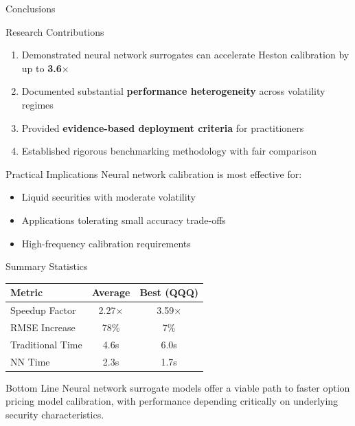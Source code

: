\documentclass{beamer}
\begin{document}
\begin{frame}{Conclusions}
    \begin{block}{Research Contributions}
        \begin{enumerate}
            \item Demonstrated neural network surrogates can accelerate Heston calibration by up to \textbf{3.6$\times$}
            \item Documented substantial \textbf{performance heterogeneity} across volatility regimes
            \item Provided \textbf{evidence-based deployment criteria} for practitioners
            \item Established rigorous benchmarking methodology with fair comparison
        \end{enumerate}
    \end{block}

    \vspace{0.3cm}

    \begin{alertblock}{Practical Implications}
        Neural network calibration is most effective for:
        \begin{itemize}
            \item Liquid securities with moderate volatility
            \item Applications tolerating small accuracy trade-offs
            \item High-frequency calibration requirements
        \end{itemize}
    \end{alertblock}
\end{frame}

\begin{frame}{Summary Statistics}
    \centering
    \begin{tabular}{lcc}
        \toprule
        \textbf{Metric} & \textbf{Average} & \textbf{Best (QQQ)} \\
        \midrule
        Speedup Factor & 2.27$\times$ & 3.59$\times$ \\
        RMSE Increase & 78\% & 7\% \\
        Traditional Time & 4.6s & 6.0s \\
        NN Time & 2.3s & 1.7s \\
        \bottomrule
    \end{tabular}

    \vspace{1cm}

    \begin{block}{Bottom Line}
        Neural network surrogate models offer a viable path to faster option pricing model calibration, with performance depending critically on underlying security characteristics.
    \end{block}
\end{frame}
\end{document}
